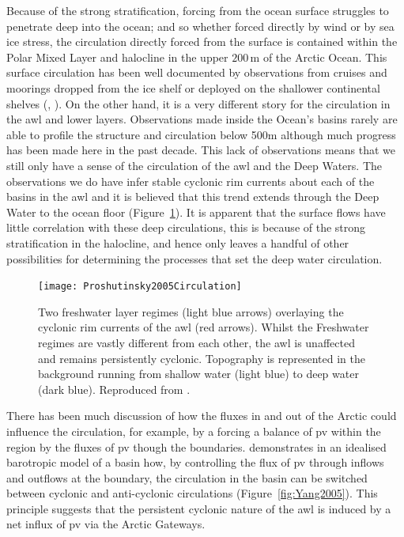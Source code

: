 \documentclass[12pt,a4paper]{report}
\newcommand*\figref[1]{Figure~\ref{#1}}
\begin{document}
Because of the strong stratification, forcing from the ocean surface 
struggles to penetrate deep into the ocean; and so whether forced directly by wind 
or by sea ice stress, the circulation
directly forced from the surface is contained within the Polar Mixed Layer 
and halocline in the upper $200\,\mathrm{m}$ of the Arctic Ocean. 
This surface circulation has been well documented by observations
from cruises and moorings  dropped  from  the  ice  shelf  or  deployed  on 
the  shallower  continental  shelves (\cite{gerdes1997large}, \cite{jones2001circulation}). On the other hand, it is a very different
story for the circulation in the \gls{awl} and lower layers. Observations made
inside the Ocean's basins rarely are able to profile the structure  and
circulation  below 500m  although much progress has been made here in the
past decade. This lack of observations means that  we  still only have  a  sense  of  the circulation 
of the \gls{awl} and the Deep  Waters.  The  observations  we  do 
have  infer stable cyclonic  rim  currents about each of the basins in the
\gls{awl} and it is believed that this trend extends through the Deep Water to the 
ocean floor (\figref{fig:Proshutinsky2005Circulation}).  It is apparent that the surface flows have little correlation with these deep circulations, this is because of the 
strong stratification in the halocline, and hence only leaves a handful of other possibilities for determining the processes that set the deep water circulation.


\begin{figure}
	\centering
	\texttt{[image: Proshutinsky2005Circulation]}
	\caption[\cite{proshutinsky2005arctic}]{ Two freshwater layer regimes (light 
		blue arrows) overlaying the cyclonic rim currents of the \gls{awl} (red arrows).
		Whilst the Freshwater regimes are vastly different from each other, the
		\gls{awl} is unaffected and remains persistently cyclonic.
		Topography is represented in the background running from 
		shallow water (light blue) to deep water (dark blue).  Reproduced from \cite{proshutinsky2005arctic}.}
	\label{fig:Proshutinsky2005Circulation}
\end{figure}

There has been much discussion
of how the fluxes in and out of the Arctic could influence the circulation,
for example, by a forcing a balance of \gls{pv} within the region by
the fluxes of \gls{pv} though the boundaries. \cite{yang2005arctic} demonstrates 
in an idealised barotropic model of a basin how, by controlling the flux 
of \gls{pv} through inflows and outflows
at the boundary, the circulation in the basin can be switched between cyclonic and
anti-cyclonic circulations (\figref{fig:Yang2005}). This principle suggests
that the persistent cyclonic nature of the \gls{awl} is induced by a 
net influx of \gls{pv} via the Arctic Gateways. 
\end{document}
